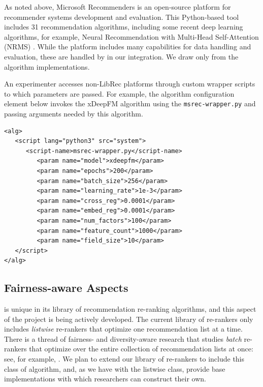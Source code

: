 
As noted above, Microsoft Recommenders \cite{MicrosoftRecommenders} is an open-source platform for recommender systems development and evaluation. This Python-based tool includes 31 recommendation algorithms, including some recent deep learning algorithms, for example, Neural Recommendation with Multi-Head Self-Attention (NRMS) \cite{wu2019neural}. While the platform includes many capabilities for data handling and evaluation, these are handled by \libauto{} in our integration. We draw only from the algorithm implementations. 

An experimenter accesses non-LibRec platforms through custom wrapper scripts to which parameters are passed. For example, the algorithm configuration element below invokes the xDeepFM algorithm using the \texttt{msrec-wrapper.py} and passing arguments needed by this algorithm.

{\small
\begin{verbatim}
<alg>
   <script lang="python3" src="system">
      <script-name>msrec-wrapper.py</script-name>
         <param name="model">xdeepfm</param>
         <param name="epochs">200</param>
         <param name="batch_size">256</param>
         <param name="learning_rate">1e-3</param>
         <param name="cross_reg">0.0001</param>
         <param name="embed_reg">0.0001</param>
         <param name="num_factors">100</param>
         <param name="feature_count">1000</param>
         <param name="field_size">10</param>
   </script>
</alg>
\end{verbatim}}

\subsection{Fairness-aware Aspects}

\libauto{} is unique in its library of recommendation re-ranking algorithms, and this aspect of the project is being actively developed. The current library of re-rankers only includes \textit{listwise} re-rankers that optimize one recommendation list at a time. There is a thread of fairness- and diversity-aware research that studies \textit{batch} re-rankers that optimize over the entire collection of recommendation lists at once: see, for example, \cite{surer2018multistakeholder,patro2020fairrec,mansoury2020fairmatch}. We plan to extend our library of re-rankers to include this class of algorithm, and, as we have with the listwise class, provide base implementations with which researchers can construct their own.


